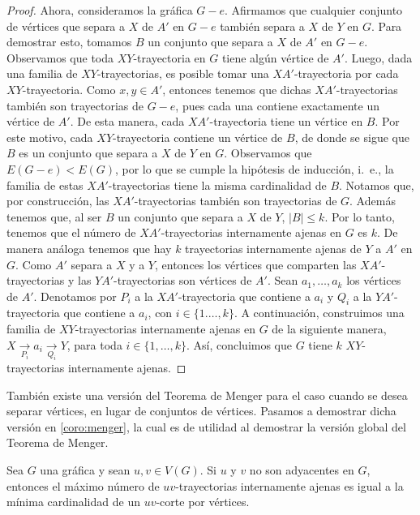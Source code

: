 \begin{proof}
    Ahora, consideramos la gr\'afica $G-e$. Afirmamos que cualquier conjunto de
    v\'ertices que separa a $X$ de $A'$ en $G-e$ tambi\'en separa a $X$ de $Y$
    en $G$. Para demostrar esto, tomamos $B$ un conjunto que separa a $X$ de
    $A'$ en $G-e$. Observamos que toda $XY$-trayectoria en $G$ tiene alg\'un
    v\'ertice de $A'$. Luego, dada una familia de $XY$-trayectorias, es posible
    tomar una $XA'$-trayectoria por cada $XY$-trayectoria. Como $x,y \in A'$,
    entonces tenemos que dichas $XA'$-trayectorias tambi\'en son trayectorias de
    $G-e$, pues cada una contiene exactamente un v\'ertice de $A'$. De esta
    manera, cada $XA'$-trayectoria tiene un v\'ertice en $B$. Por este motivo,
    cada $XY$-trayectoria contiene un v\'ertice de $B$, de donde se sigue que
    $B$ es un conjunto que separa a $X$ de $Y$ en $G$. Observamos que
    $E(G-e)<E(G)$, por lo que se cumple la hip\'otesis de inducci\'on, i.~e., la
    familia de estas $XA'$-trayectorias tiene la misma cardinalidad de $B$.
    Notamos que, por construcci\'on, las $XA'$-trayectorias tambi\'en son
    trayectorias de $G$. Adem\'as tenemos que, al ser $B$ un conjunto que separa
    a $X$ de $Y$, $|B| \leq k$. Por lo tanto, tenemos que el n\'umero de
    $XA'$-trayectorias internamente ajenas en $G$ es $k$. De manera an\'aloga
    tenemos que hay $k$ trayectorias internamente ajenas de $Y$ a $A'$ en $G$.
    Como $A'$ separa a $X$ y a $Y$, entonces los v\'ertices que comparten las
    $XA'$-trayectorias y las $YA'$-trayectorias son v\'ertices de $A'$. Sean
    $a_1, \dots, a_k$ los v\'ertices de $A'$. Denotamos por $P_i$ a la
    $XA'$-trayectoria que contiene a $a_i$ y $Q_i$ a la $YA'$-trayectoria que
    contiene a $a_i$, con $i \in \{1. \dots, k\}$. A continuaci\'on, construimos
    una familia de $XY$-trayectorias internamente ajenas en $G$ de la siguiente
    manera, $X \xrightarrow[P_i]{} a_i \xrightarrow[Q_i]{} Y$, para toda $i \in
    \{1, \dots, k\}$. As\'i, concluimos que $G$ tiene $k$ $XY$-trayectorias
    internamente ajenas. 
\end{proof}

 Tambi\'en existe una versi\'on del Teorema de Menger para el caso cuando se
 desea separar v\'ertices, en lugar de conjuntos de v\'ertices. Pasamos a
 demostrar dicha versi\'on en \cref{coro:menger}, la cual es de utilidad al
 demostrar la versi\'on global del Teorema de Menger.

 \begin{corolario}
    \label{coro:menger}
    Sea $G$ una gr\'afica y sean $u, v \in V(G)$. Si $u$ y $v$ no son adyacentes
    en $G$, entonces el m\'aximo n\'umero de $uv$-trayectorias internamente
    ajenas es igual a la m\'inima cardinalidad de un $uv$-corte por v\'ertices.
\end{corolario}

